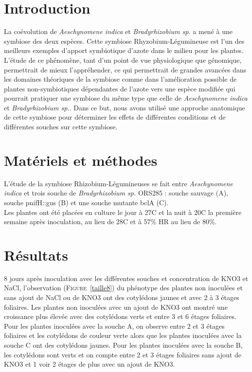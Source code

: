 \documentclass[12pt,a4paper,onecolumn]{article}
\begin{document}
	\begin{multicols}{2}


		\section{Introduction}

			La coévolution de \textit{Aeschynomene indica} et \textit{Bradyrhizobium sp.} a mené à une symbiose des deux espèces. Cette symbiose Rhyzobium-Légumineuse est l'un des meilleurs exemples d'apport symbiotique d'azote dans le milieu pour les plantes. L'étude de ce phénomène, tant d'un point de vue physiologique que génomique, permettrait de mieux l'appréhender, ce qui permettrait de grandes avancées dans les domaines théoriques de la symbiose comme dans l'amélioration possible de plantes non-symbiotiques dépendantes de l'azote vers une espèce modifiée qui pourrait pratiquer une symbiose du même type que  celle de \textit{Aeschynomene indica} et \textit{Bradyrhizobium sp.}. Dans ce but, nous avons utilisé une approche anatomique de cette symbiose pour déterminer les effets de différentes conditions et de différentes souches sur cette symbiose.

		\section{Matériels et méthodes}

			L’étude de la symbiose Rhizobium-Légumineuses se fait entre \textit{Aeschynomene indica} et trois souche de \textit{Bradyrhizobium sp.} ORS285 : souche sauvage (A), souche pnifH::gus (B) et une souche mutante bclA (C).\\

			Les plantes ont été placées en culture le jour à 27\degre C et la nuit à 20\degre C la première semaine après inoculation, au lieu de 28\degre C et à 57\% HR au lieu de 80\%.


		\section{Résultats}

			8 jours après inoculation avec les différentes souches et concentration de KNO3 et NaCl, l’observation (\textsc{Figure}~\ref{taille8}) du phénotype des plantes non inoculées et sans ajout de NaCl ou de KNO3 ont des cotylédons jaunes et avec 2 à 3 étages foliaires. Les plantes non inoculées avec un ajout de KNO3 ont montré une croissance plus élevée avec des cotylédons verts et entre 3 et 6 étages foliaires. Pour les plantes inoculées avec la souche A, on observe entre 2 et 3 étages foliaires et les cotylédons de couleur verte alors que les plantes inoculées avec la souche C ont des cotylédons jaunes. Pour les plantes inoculées avec la souche B, les cotylédons sont verts et on compte entre 2 et 3 étages foliaires sans ajout de KNO3 et 1 voir 2 étages de plus avec un ajout de KNO3.


\end{multicols}
\end{document}
